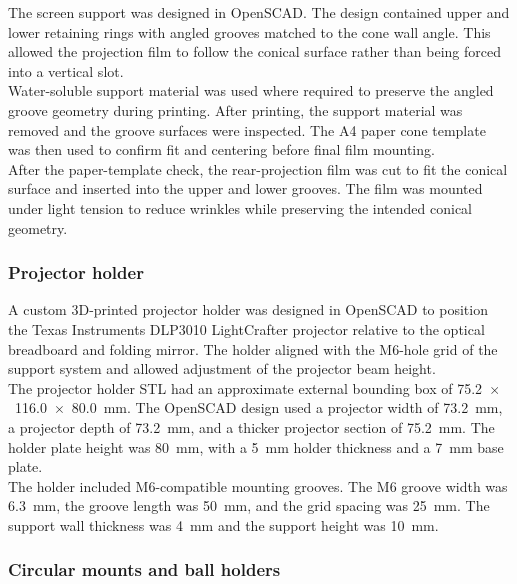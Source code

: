 The screen support was designed in OpenSCAD. The design contained upper and lower retaining rings with angled grooves matched to the cone wall angle. This allowed the projection film to follow the conical surface rather than being forced into a vertical slot.\\

Water-soluble support material was used where required to preserve the angled groove geometry during printing. After printing, the support material was removed and the groove surfaces were inspected. The A4 paper cone template was then used to confirm fit and centering before final film mounting.\\

After the paper-template check, the rear-projection film was cut to fit the conical surface and inserted into the upper and lower grooves. The film was mounted under light tension to reduce wrinkles while preserving the intended conical geometry.\\

\subsubsection{Projector holder}

A custom 3D-printed projector holder was designed in OpenSCAD to position the Texas Instruments DLP3010 LightCrafter projector relative to the optical breadboard and folding mirror. The holder aligned with the M6-hole grid of the support system and allowed adjustment of the projector beam height.\\

The projector holder STL had an approximate external bounding box of 75.2~$\times$~116.0~$\times$~80.0~mm. The OpenSCAD design used a projector width of 73.2~mm, a projector depth of 73.2~mm, and a thicker projector section of 75.2~mm. The holder plate height was 80~mm, with a 5~mm holder thickness and a 7~mm base plate.\\

The holder included M6-compatible mounting grooves. The M6 groove width was 6.3~mm, the groove length was 50~mm, and the grid spacing was 25~mm. The support wall thickness was 4~mm and the support height was 10~mm.\\

\subsubsection{Circular mounts and ball holders}

